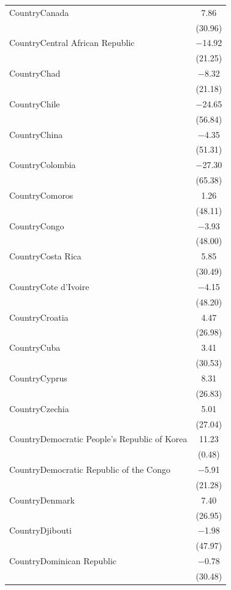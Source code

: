 \documentclass[
  letterpaper,
  DIV=11,
  numbers=noendperiod]{scrartcl}
\begin{document}
\begin{table}
{\begin{tabular}[t]{lc}
CountryCanada & \num{7.86}\\
 & (\num{30.96})\\
CountryCentral African Republic & \num{-14.92}\\
 & \vphantom{1} (\num{21.25})\\
CountryChad & \num{-8.32}\\
 & (\num{21.18})\\
CountryChile & \num{-24.65}\\
 & (\num{56.84})\\
CountryChina & \num{-4.35}\\
 & \vphantom{2} (\num{51.31})\\
CountryColombia & \num{-27.30}\\
 & (\num{65.38})\\
CountryComoros & \num{1.26}\\
 & (\num{48.11})\\
CountryCongo & \num{-3.93}\\
 & (\num{48.00})\\
CountryCosta Rica & \num{5.85}\\
 & (\num{30.49})\\
CountryCote d'Ivoire & \num{-4.15}\\
 & (\num{48.20})\\
CountryCroatia & \num{4.47}\\
 & \vphantom{3} (\num{26.98})\\
CountryCuba & \num{3.41}\\
 & (\num{30.53})\\
CountryCyprus & \num{8.31}\\
 & (\num{26.83})\\
CountryCzechia & \num{5.01}\\
 & \vphantom{1} (\num{27.04})\\
CountryDemocratic People's Republic of Korea & \num{11.23}\\
 & (\num{0.48})\\
CountryDemocratic Republic of the Congo & \num{-5.91}\\
 & \vphantom{1} (\num{21.28})\\
CountryDenmark & \num{7.40}\\
 & \vphantom{1} (\num{26.95})\\
CountryDjibouti & \num{-1.98}\\
 & (\num{47.97})\\
CountryDominican Republic & \num{-0.78}\\
 & \vphantom{1} (\num{30.48})\\

\end{tabular}}
\end{table}
\end{document}
